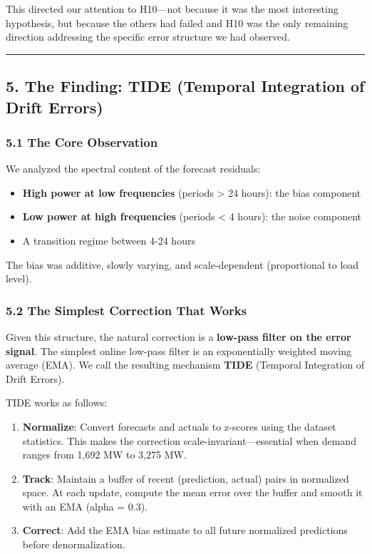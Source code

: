 This directed our attention to H10---not because it was the most
interesting hypothesis, but because the others had failed and H10 was
the only remaining direction addressing the specific error structure we
had observed.

\begin{center}\rule{0.5\linewidth}{0.5pt}\end{center}

\subsection{5. The Finding: TIDE (Temporal Integration of Drift
Errors)}\label{the-finding-tide-temporal-integration-of-drift-errors}

\subsubsection{5.1 The Core Observation}\label{the-core-observation}

We analyzed the spectral content of the forecast residuals:

\begin{itemize}
\tightlist
\item
  \textbf{High power at low frequencies} (periods \textgreater{} 24
  hours): the bias component
\item
  \textbf{Low power at high frequencies} (periods \textless{} 4 hours):
  the noise component
\item
  A transition regime between 4-24 hours
\end{itemize}

The bias was additive, slowly varying, and scale-dependent (proportional
to load level).

\subsubsection{5.2 The Simplest Correction That
Works}\label{the-simplest-correction-that-works}

Given this structure, the natural correction is a \textbf{low-pass
filter on the error signal}. The simplest online low-pass filter is an
exponentially weighted moving average (EMA). We call the resulting
mechanism \textbf{TIDE} (Temporal Integration of Drift Errors).

TIDE works as follows:

\begin{enumerate}
\def\labelenumi{\arabic{enumi}.}
\tightlist
\item
  \textbf{Normalize}: Convert forecasts and actuals to z-scores using
  the dataset statistics. This makes the correction
  scale-invariant---essential when demand ranges from 1,692 MW to 3,275
  MW.
\item
  \textbf{Track}: Maintain a buffer of recent (prediction, actual) pairs
  in normalized space. At each update, compute the mean error over the
  buffer and smooth it with an EMA (alpha = 0.3).
\item
  \textbf{Correct}: Add the EMA bias estimate to all future normalized
  predictions before denormalization.
\end{enumerate}

